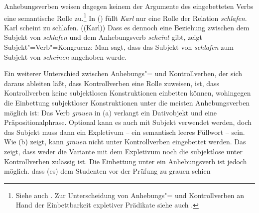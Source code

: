 Anhebungsverben weisen dagegen keinem der Argumente des eingebetteten Verbs eine
semantische Rolle zu.\footnote{
        Siehe auch .
        Zur Unterscheidung von Anhebungs"= und Kontrollverben an Hand
        der Einbettbarkeit expletiver Prädikate siehe auch
        .
}
In () füllt \emph{Karl} nur eine Rolle der Relation \emph{schlafen}.
\eal
\ex Karl scheint zu schlafen.
\ex {}((Karl))
\zl
Dass es dennoch eine Beziehung zwischen dem Subjekt von \emph{schlafen} und dem Anhebungsverb
\emph{scheint} gibt, zeigt Subjekt"=Verb"=Kongruenz:
\eal
{}
\zl
Man sagt, dass das Subjekt von \emph{schlafen} zum Subjekt von \emph{scheinen} angehoben wurde.

Ein weiterer Unterschied zwischen Anhebungs"= und Kontrollverben, der sich daraus ableiten läßt, dass
Kontrollverben eine Rolle zuweisen, ist, dass Kontrollverben keine subjektlosen Konstruktionen einbetten
können, wohingegen die Einbettung subjektloser Konstruktionen unter die meisten Anhebungsverben
möglich ist:
\eal
{}
\zl
Das Verb \emph{grauen} in (a) verlangt ein Dativobjekt und eine Präpositionalphrase.
Optional kann es auch mit Subjekt verwendet werden, doch das Subjekt muss dann ein Expletivum -- ein semantisch
leeres Füllwort -- sein. Wie (b) zeigt, kann \emph{grauen} nicht unter Kontrollverben eingebettet werden.
Das zeigt, dass weder die Variante mit dem Expletivum noch die subjektlose unter Kontrollverben
zulässig ist. Die Einbettung unter ein Anhebungsverb ist jedoch möglich. 
\ea
dass (es) dem Studenten vor der Prüfung zu grauen schien
\z

